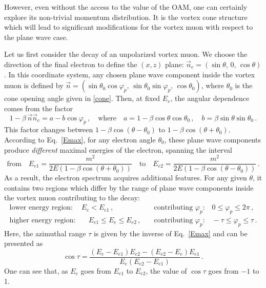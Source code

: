\documentclass[aps,prd,longbibliography,nofootinbib,amsthm,amsmath,amssymb,amsfonts,notitlepage]{revtex4-1}
\begin{document}
However, even without the access to the value of the OAM, one can certainly explore its non-trivial
momentum distribution. It is the vortex cone structure which will lead to significant modifications
for the vortex muon with respect to the plane wave case.

Let us first consider the decay of an unpolarized vortex muon.
We choose the direction of the final electron
to define the $(x,z)$ plane: $\vec n_e = (\sin\theta,\, 0,\, \cos\theta)$.
In this coordinate system, any chosen plane wave component inside the vortex muon
is defined by $\vec n = (\sin\theta_0 \cos\varphi_p,\, \sin\theta_0\sin\varphi_p,\,\cos\theta_0)$,
where $\theta_0$ is the cone opening angle given in \eqref{cone}.
Then, at fixed $E_e$, the angular dependence comes from the factor
\begin{equation}
1-\beta\, \vec n\vec n_e = a - b \cos\varphi_p\,, \quad \mbox{where}\quad 
a = 1 - \beta \cos\theta\cos\theta_0\,, \quad b = \beta \sin\theta\sin\theta_0 \,.\label{ab}
\end{equation}
This factor changes between $1 - \beta \cos(\theta-\theta_0)$ to $1 - \beta \cos(\theta+\theta_0)$.
According to Eq.~\eqref{Emax}, for any electron angle $\theta_0$,
these plane wave components produce {\em different} maximal energies of the electron, spanning the interval
\begin{equation}
\mbox{from}\quad E_{e1} = \frac{m^2}{2E (1-\beta\cos(\theta+\theta_0))}\quad \mbox{to} \quad
E_{e2} = \frac{m^2}{2E (1-\beta\cos(\theta-\theta_0))}\,.\label{Emax12}
\end{equation}
As a result, the electron spectrum acquires additional features.
For any given $\theta$, it contains two regions which differ by the range of plane wave components
inside the vortex muon contributing to the decay:
\begin{eqnarray}
\mbox{lower energy region:}& E_e < E_{e1}\,,& \mbox{contributing $\varphi_p$:} \quad 0 \le \varphi_p \le 2\pi\,,\nonumber\\
\mbox{higher energy region:}& \quad E_{e1} \le E_e \le E_{e2}\,, \quad & \mbox{contributing $\varphi_p$:} \quad -\tau \le \varphi_p \le \tau\,.\label{two-regions}
\end{eqnarray}
Here, the azimuthal range $\tau$ is given by the inverse of Eq.~\eqref{Emax} and can be presented as
\begin{equation}
\cos\tau = \frac{(E_e-E_{e1})E_{e2} - (E_{e2}-E_e)E_{e1}}{E_e(E_{e2}-E_{e1})}\,. \label{tau}
\end{equation}
One can see that, as $E_e$ goes from $E_{e1}$ to $E_{e2}$, the value of $\cos\tau$ goes from $-1$ to 1.
\end{document}
